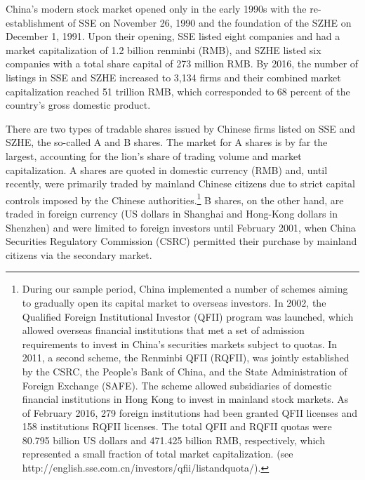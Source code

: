 \documentclass[11pt]{article}
\begin{document}
China's modern stock market opened only in the early 1990s with the re-establishment of SSE on November 26, 1990 and the foundation of the SZHE on December 1, 1991. %
Upon their opening, SSE listed eight companies and had a market capitalization of 1.2 billion renminbi (RMB), and SZHE listed six companies with a total share capital of 273 million RMB. By 2016, the number of listings in SSE and SZHE increased to 3,134 firms and their combined market capitalization reached 51 trillion RMB, which corresponded to 68 percent of the country's gross domestic product. 

There are two types of tradable shares issued by Chinese firms listed on SSE and SZHE, the so-called A and B shares. The market for A shares is by far the largest, accounting for the lion's share of trading volume and market capitalization. A shares are quoted in domestic currency (RMB) and, until recently, were primarily traded by mainland Chinese citizens due to strict capital controls imposed by the Chinese authorities.\footnote{During our sample period, China implemented a number of schemes aiming to gradually open its capital market to overseas investors. In 2002, the Qualified Foreign Institutional Investor (QFII) program was launched, which allowed overseas financial institutions that met a set of admission requirements to invest in China’s securities markets subject to quotas. In 2011, a second scheme, the Renminbi QFII (RQFII), was jointly established by the CSRC, the People’s Bank of China, and the State Administration of Foreign Exchange (SAFE). The scheme allowed subsidiaries of domestic financial institutions in Hong Kong to invest in mainland stock markets. As of February 2016, 279 foreign institutions had been granted QFII licenses and 158 institutions RQFII licenses. The total QFII and RQFII quotas were 80.795 billion US dollars and 471.425 billion RMB, respectively, which represented a small fraction of total market capitalization. (see http://english.sse.com.cn/investors/qfii/listandquota/).} B shares, on the other hand, are traded in foreign currency (US dollars in Shanghai and Hong-Kong dollars in Shenzhen) and were limited to foreign investors until February 2001, when China Securities Regulatory Commission (CSRC) permitted their purchase by mainland citizens via the secondary market. 
\end{document}
